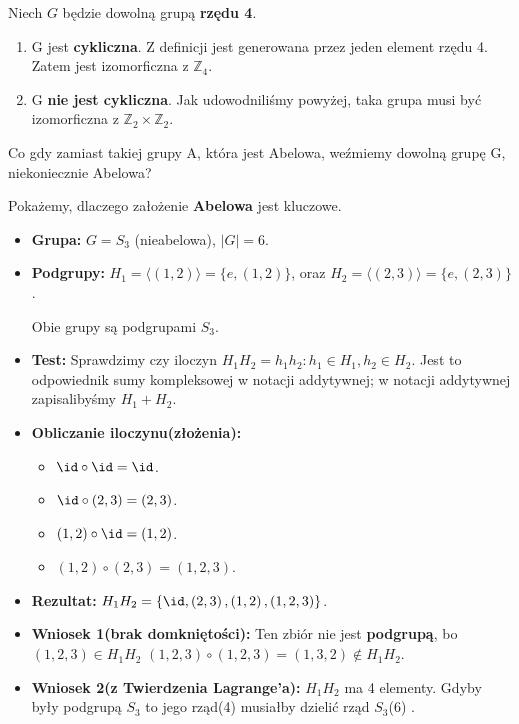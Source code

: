 \begin{corollary}
	Niech $G$ będzie dowolną grupą \textbf{rzędu 4}.
	\begin{enumerate}[label=\textbf{Przypadek \arabic*:}, wide]
		\item G jest \textbf{cykliczna}. Z definicji jest generowana przez jeden element rzędu 4. Zatem jest izomorficzna z $\mathbb{Z}_4$.
		\item G \textbf{nie jest cykliczna}. Jak udowodniliśmy powyżej, taka grupa musi być izomorficzna z $\mathbb{Z}_2\times \mathbb{Z}_2$.
	\end{enumerate}
\end{corollary}

\begin{question}
Co gdy zamiast takiej grupy A, która jest Abelowa, weźmiemy dowolną grupę G, niekoniecznie Abelowa?
\end{question}

\begin{eg}
	Pokażemy, dlaczego założenie \textbf{Abelowa} jest kluczowe.
	\begin{itemize}
		\item \textbf{Grupa: } $G = S_3$ (nieabelowa), $\left| G \right| = 6$.
		\item \textbf{Podgrupy: } $H_1 = \langle \left( 1,2 \right)  \rangle = \{e, \left( 1,2 \right) \} $, oraz $H_2 = \langle \left( 2,3 \right)  \rangle = \{e, \left( 2,3 \right) \}$.

			Obie grupy są podgrupami $S_3$.
		\item \textbf{Test: } Sprawdzimy czy iloczyn $H_1H_2 = h_1h_2: h_1\in H_1, h_2 \in H_2$. Jest to odpowiednik sumy kompleksowej w notacji addytywnej; w notacji addytywnej zapisalibyśmy $H_1+H_2$. 
		\item \textbf{Obliczanie iloczynu(złożenia): }
			\begin{itemize}
				\item $\id \circ \id = \id$.
				\item $\id \circ \left( 2,3\right) = \left( 2,3 \right) $.
				\item $\left( 1,2 \right) \circ \id = \left( 1,2 \right) $.
				\item $\left( 1,2 \right) \circ \left( 2,3 \right) = \left( 1,2,3 \right) $.
			\end{itemize}
		\item \textbf{Rezultat: } $H_1H_2 = \{\id, \left( 2,3 \right), \left( 1,2 \right), \left( 1,2,3 \right) \} $.
		\item \textbf{Wniosek 1(brak domkniętości): } Ten zbiór nie jest \textbf{podgrupą}, bo $\left( 1,2,3 \right) \in H_1H_2$ $\left( 1,2,3 \right) \circ \left( 1,2,3 \right) = \left( 1,3,2 \right) \not\in H_1H_2$.
		\item \textbf{Wniosek 2(z Twierdzenia Lagrange'a): } $H_1H_2$ ma 4 elementy. Gdyby były podgrupą $S_3$ to jego rząd(4) musiałby dzielić rząd $S_3$(6) .
	\end{itemize}
\end{eg}

